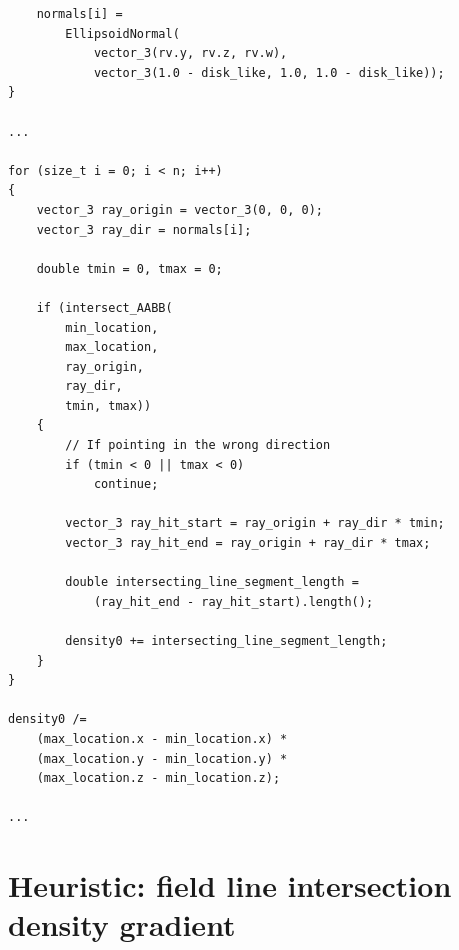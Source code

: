 \documentclass[12pt]{article}
\begin{document}
\begin{lstlisting}
	normals[i] = 
		EllipsoidNormal(
			vector_3(rv.y, rv.z, rv.w), 
			vector_3(1.0 - disk_like, 1.0, 1.0 - disk_like));
}

...

for (size_t i = 0; i < n; i++)
{
	vector_3 ray_origin = vector_3(0, 0, 0);
	vector_3 ray_dir = normals[i];

	double tmin = 0, tmax = 0;

	if (intersect_AABB(
		min_location, 
		max_location, 
		ray_origin, 
		ray_dir, 
		tmin, tmax))
	{
		// If pointing in the wrong direction
		if (tmin < 0 || tmax < 0)
			continue;

		vector_3 ray_hit_start = ray_origin + ray_dir * tmin;
		vector_3 ray_hit_end = ray_origin + ray_dir * tmax;

		double intersecting_line_segment_length = 
			(ray_hit_end - ray_hit_start).length();

		density0 += intersecting_line_segment_length;
	}
}

density0 /= 
	(max_location.x - min_location.x) * 
	(max_location.y - min_location.y) * 
	(max_location.z - min_location.z);

...
\end{lstlisting}

\section{Heuristic: field line intersection density gradient}
\end{document}
